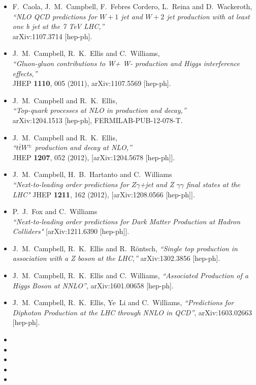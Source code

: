 \begin{itemize}
{  correlations,''} \\
 JHEP {\bf 1103}, 027 (2011)
  [arXiv:1011.6647 [hep-ph]].
\item F.~Caola, J.~M.~Campbell, F.~Febres Cordero, L.~Reina and D.~Wackeroth, \\
  {\it ``NLO QCD predictions for $W+1$ jet and $W+2$ jet production with at least one b jet at the 7 TeV LHC,''} \\
    arXiv:1107.3714 [hep-ph].
\item J.~M.~Campbell, R.~K.~Ellis and C.~Williams, \\
  {\it ``Gluon-gluon contributions to W+ W- production and Higgs interference effects,''} \\
  JHEP {\bf 1110}, 005 (2011),
  arXiv:1107.5569 [hep-ph].
\item J.~M.~Campbell and R.~K.~Ellis, \\
  {\it ``Top-quark processes at NLO in production and decay,''} \\
  arXiv:1204.1513 [hep-ph], FERMILAB-PUB-12-078-T.
\item J.~M.~Campbell and R.~K.~Ellis, \\
  {\it ``$t \bar{t} W^{\pm}$ production and decay at NLO,''} \\
  JHEP {\bf 1207}, 052 (2012), [arXiv:1204.5678 [hep-ph]].
\item
 J.~M.~Campbell, H.~B.~Hartanto and C.~Williams\\
  {\it {``Next-to-leading order predictions for $Z \gamma$+jet and
          Z $\gamma \gamma$ final states at the LHC"}}
   JHEP {\bf 1211}, 162 (2012), [arXiv:1208.0566 [hep-ph]].	
\item
 P.~J.~Fox  and C.~Williams\\
      {\it {``Next-to-leading order predictions for Dark Matter Production at Hadron Colliders"}}
                        	 [arXiv:1211.6390 [hep-ph]].	 
\item
  J.~M.~Campbell, R.~K.~Ellis and R.~R{\"o}ntsch,
  {\it ``Single top production in association with a Z boson at the LHC,''}
  arXiv:1302.3856 [hep-ph].

\item
 J.~M.~Campbell, R.~K.~Ellis and C.~Williams,
 {\it ``Associated Production of a Higgs Boson at NNLO''},
  arXiv:1601.00658 [hep-ph].
  
\item 
 J.~M.~Campbell, R.~K.~Ellis, Ye~Li and C.~Williams,
  {\it ``Predictions for Diphoton Production at the LHC through NNLO in QCD''},
  arXiv:1603.02663 [hep-ph]. 
  
\item {}

\item {}

\item {}

\item {}

\item {}

\end{itemize}
